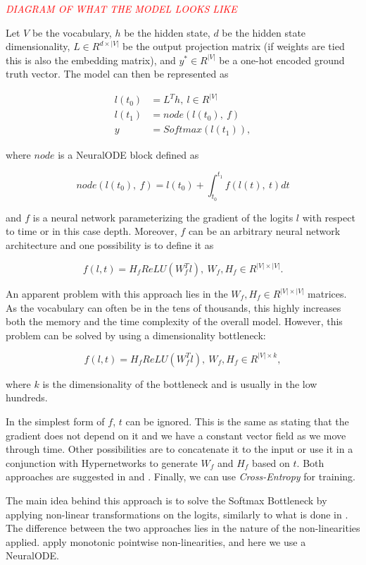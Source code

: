 \begin{center}
    \textcolor{red}{\emph{DIAGRAM OF WHAT THE MODEL LOOKS LIKE}}
\end{center}

Let $ V $ be the vocabulary, $ h $ be the hidden state, $ d $ be the hidden state dimensionality, $ L \in R^{d \times |V|} $ be the output projection matrix (if weights are tied \citep{inan2016tying} this is also the embedding matrix), and $ y^* \in R^{|V|} $ be a one-hot encoded ground truth vector. The model can then be represented as

\begin{align*}
    l(t_0) &= L^T h, \ l \in R^{|V|} \\
    l(t_1) &= node(l(t_0), \ f) \\
    y &= Softmax(l(t_1)),
\end{align*}

where $ node $ is a NeuralODE block defined as

\begin{displaymath}
    node(l(t_0), \ f) = l(t_0) + \int_{t_0}^{t_1} f(l(t), \ t) dt    
\end{displaymath}

and $ f $ is a neural network parameterizing the gradient of the logits $ l $ with respect to time or in this case depth. Moreover, $ f $ can be an arbitrary neural network architecture and one possibility is to define it as

\begin{displaymath}
    f(l, t) = H_f ReLU(W_f^T l), \ W_f, H_f \in R^{|V| \times |V|}.    
\end{displaymath}

An apparent problem with this approach lies in the $ W_f, H_f \in R^{ |V| \times |V| } $ matrices. As the vocabulary can often be in the tens of thousands, this highly increases both the memory and the time complexity of the overall model. However, this problem can be solved by using a dimensionality bottleneck:

\begin{displaymath}
    f(l, t) = H_f ReLU(W_f^T l), \ W_f, H_f \in R^{|V| \times k},
\end{displaymath}

where $ k $ is the dimensionality of the bottleneck and is usually in the low hundreds.

In the simplest form of $ f $, $ t $ can be ignored. This is the same as stating that the gradient does not depend on it and we have a constant vector field as we move through time. Other possibilities are to concatenate it to the input or use it in a conjunction with Hypernetworks \citep{ha2016hypernetworks} to generate $ W_f $ and $ H_f $ based on $ t $. Both approaches are suggested in \citet{chen2018neural} and \citet{grathwohl2018ffjord}. Finally, we can use \emph{Cross-Entropy} for training.

The main idea behind this approach is to solve the Softmax Bottleneck by applying non-linear transformations on the logits, similarly to what is done in \citep{ganea2019breaking}. The difference between the two approaches lies in the nature of the non-linearities applied. \citet{ganea2019breaking} apply monotonic pointwise non-linearities, and here we use a NeuralODE.
